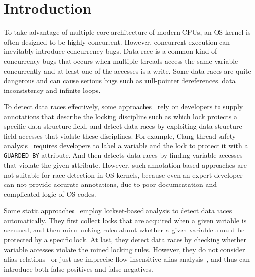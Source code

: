 \section{Introduction}
\label{sec_introduction}

To take advantage of multiple-core architecture of modern CPUs, an OS kernel is 
often designed to be highly concurrent. However, concurrent execution can 
inevitably introduce concurrency bugs. Data race is a common kind of 
concurrency bugs that occurs when multiple threads access the same variable 
concurrently and at least one of the accesses is a write. Some data races are 
quite dangerous and can cause serious bugs such as null-pointer dereferences, 
data inconsistency and infinite loops.

To detect data races effectively, some approaches~\cite{Boyapati:OOPSLA02, 
Anderson:PLDI08, Anderson:PLDI09, Zhou:MICRO19, Flanagan:PASTE01, 
Flanagan:PLDI00, Sadowski:PLATEAU14, ClangThreadSafety, Blackshear:OOPSLA18} 
rely on developers to 
supply annotations that describe the locking discipline such as which lock 
protects a specific data structure field, and detect data races by exploiting 
data structure field accesses that violate these disciplines. For example, 
Clang thread safety analysis~\cite{ClangThreadSafety} requires developers to 
label a variable and the lock to protect it with a {\tt GUARDED\_BY} attribute. 
And then detects data races by finding variable accesses that violate the given 
attribute. However, such annotation-based approaches are not suitable for race 
detection in OS kernels, because even an expert developer can not provide 
accurate annotations, due to poor documentation and complicated logic of OS 
codes.

Some static approaches~\cite{Choi:PLDI02, Engler:SOSP03, Voung:FSE07, 
Pratikakis:PLDI06, Naik:PLDI06} employ lockset-based analysis to detect data 
races automatically. They first collect locks that are acquired when a given 
variable is accessed, and then mine locking rules about whether a given 
variable should be protected by a specific lock. At last, they detect data 
races by checking whether variable accesses violate the mined locking rules. 
However, they do not consider alias relations~\cite{Voung:FSE07, Engler:SOSP03} 
or just use imprecise flow-insensitive alias analysis~\cite{Choi:PLDI02, 
Pratikakis:PLDI06, Naik:PLDI06}, and thus can introduce both false positives 
and false negatives.

